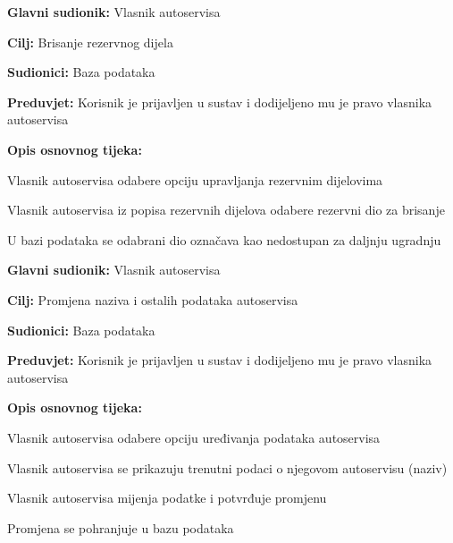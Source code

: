 \noindent {}
\begin{packed_item}
	
	\item \textbf{Glavni sudionik: } Vlasnik autoservisa
	\item  \textbf{Cilj:} Brisanje rezervnog dijela
	\item  \textbf{Sudionici:} Baza podataka
	\item  \textbf{Preduvjet:} Korisnik je prijavljen u sustav i dodijeljeno
	mu je pravo vlasnika autoservisa
	\item  \textbf{Opis osnovnog tijeka:}
	
	\item[] \begin{packed_enum}
		
		\item Vlasnik autoservisa odabere opciju upravljanja rezervnim dijelovima
		\item Vlasnik autoservisa iz popisa rezervnih dijelova odabere rezervni
		dio za brisanje
		\item U bazi podataka se odabrani dio označava kao nedostupan za daljnju
		ugradnju
		
	\end{packed_enum}
\end{packed_item}




\noindent {}
\begin{packed_item}
	
	\item \textbf{Glavni sudionik: } Vlasnik autoservisa
	\item  \textbf{Cilj:} Promjena naziva i ostalih podataka autoservisa
	\item  \textbf{Sudionici:} Baza podataka
	\item  \textbf{Preduvjet:} Korisnik je prijavljen u sustav i dodijeljeno
	mu je pravo vlasnika autoservisa
	\item  \textbf{Opis osnovnog tijeka:}
	
	\item[] \begin{packed_enum}
		
		\item Vlasnik autoservisa odabere opciju uređivanja podataka autoservisa
		\item Vlasnik autoservisa se prikazuju trenutni podaci o njegovom
		autoservisu (naziv)
		\item Vlasnik autoservisa mijenja podatke i potvrđuje promjenu
		\item Promjena se pohranjuje u bazu podataka
		
	\end{packed_enum}
\end{packed_item}





